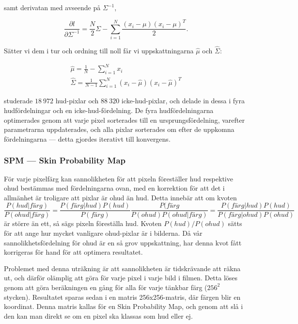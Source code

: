\documentclass[../rapport_MVEX01-11-05]{subfiles}
\begin{document}
samt derivatan med avseende på $\Sigma^{-1}$,

\begin{equation*}
  \frac{\partial l}{\partial \Sigma^{-1}}=\frac{N}{2}\Sigma
  -\sum_{i=1}^N\frac{(x_i-\mu)(x_i-\mu)^T}{2}.
\end{equation*}

Sätter vi dem i tur och ordning till noll får vi uppskattningarna $\hat\mu$ och $\hat\Sigma$:


\begin{gather*}
  \hat\mu    =\frac{1}{N}-\sum_{i=1}^Nx_i\\
  \hat\Sigma =\frac{1}{N-1}\sum_{i=1}^N(x_i-\hat\mu)(x_i-\hat\mu)^T
\end{gather*}

 studerade $18\:972$
hud-pixlar och $88\:320$ icke-hud-pixlar, och delade in dessa i fyra
hudfördelningar och en icke-hud-fördelning. De fyra hudfördelningarna
optimerades genom att varje pixel sorterades till en
ursprungsfördelning, varefter parametrarna uppdaterades, och alla
pixlar sorterades om efter de uppkomna fördelningarna --- detta gjordes
iterativt till konvergens.


\subsubsection{SPM --- Skin Probability Map}

För varje pixelfärg kan sannolikheten för att pixeln föreställer hud
respektive ohud bestämmas med fördelningarna ovan, med en korrektion
för att det i allmänhet är troligare att pixlar är ohud än hud. Detta
innebär att om kvoten
\begin{equation*}
\frac{P(hud|färg)}{P(ohud|färg)}=\frac{P(färg|hud)P(hud)}{P(färg)}\frac{P(färg}{P(ohud)P(ohud|färg)}=\frac{P(färg|hud)P(hud)}{P(färg|ohud)P(ohud)}
\end{equation*}
är större än ett, så sägs pixeln föreställa hud. Kvoten
$P(hud)/P(ohud)$ sätts för att ange hur mycket vanligare ohud-pixlar
är i bilderna. Då vår sannolikhetsfördelning för ohud är en så grov
uppskattning, har denna kvot fått korrigeras för hand för att optimera
resultatet.

Problemet med denna uträkning är att sannolikheten är tidskrävande att
räkna ut, och därför olämplig att göra för varje pixel i varje bild i
filmen. Detta löses genom att göra beräkningen en gång för alla för
varje tänkbar färg ($256^2$ stycken). Resultatet sparas sedan i en
matris 256x256-matris, där färgen blir en koordinat. Denna matris
kallas för en Skin Probability Map, och genom att slå i den kan man
direkt se om en pixel ska klassas som hud eller ej.
\end{document}

